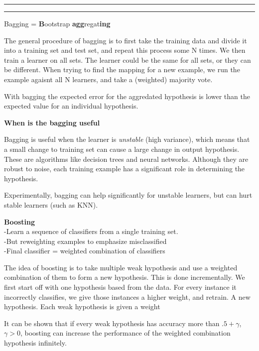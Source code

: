 \documentclass[11pt]{article}
\newcounter{questionCounter}
\newcounter{partCounter}[questionCounter]
\newenvironment{question}[2][\arabic{questionCounter}]{%
    \addtocounter{questionCounter}{1}%
    \setcounter{partCounter}{0}%
    \vspace{.25in} \hrule \vspace{0.5em}%
        \noindent{\bf #1: #2}%
    \vspace{0.8em} \hrule \vspace{.10in}%
}{}
\begin{document}
\begin{question}{Bagging and Boosting}

Bagging  = \textbf{B}ootstrap \textbf{agg}regat\textbf{ing}

The general procedure of bagging is to first take the training data and divide it
into a training set and test set, and repeat this process some N times. We then train
a learner on all sets. The learner could be the same for all sets, or they can be different.
When trying to find the mapping for a new example, we run the example agaisnt all
N learners, and take a (weighted) majority vote.

With bagging the expected error for the aggredated hypothesis is lower
than the expected value for an individual hypothesis.


\textbf{When is the bagging useful}

Bagging is useful when the learner is \emph{unstable} (high variance), which means that a small
change to training set can cause a large change in output hypothesis. These are algorithms
like decision trees and neural networks. Although they are robust to noise, each training
example has a significant role in determining the hypothesis. 

Experimentally, bagging can help significantly for unstable learners, but can hurt
stable learners (such as KNN).

\textbf{Boosting}\\
-Learn a sequence of classifiers from a single training set.\\
-But reweighting examples to emphasize misclassified\\
-Final classifier = weighted combination of classifiers
\end{question}

The idea of boosting is to take multiple weak hypothesis and use a
weighted combination of them to form a new hypothesis. This is done incrementally.
We first start off with one hypothesis based from the data. For every 
instance it incorrectly classifies, we give those instances a higher weight,
and retrain. A new hypothesis. Each weak hypothesis is given a weight

It can be shown that if every weak hypothesis has accuracy more than $.5 + \gamma$,
   $\gamma > 0$, boosting can increase the performance of the weighted combination
   hypothesis infinitely.
\end{document}
